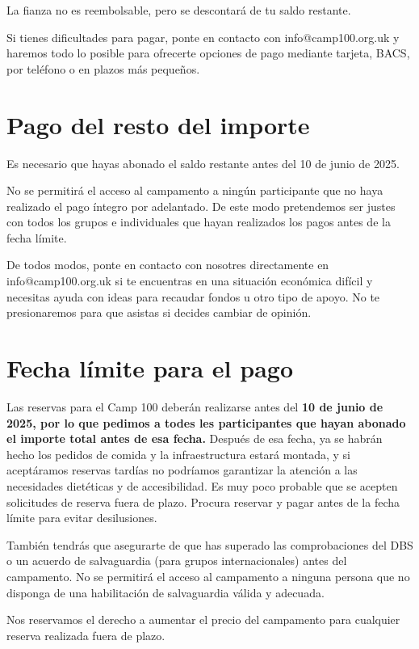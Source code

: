 \documentclass[a4paper, 11pt]{report}
\begin{document}
La fianza no es reembolsable, pero se descontar\'a de tu saldo restante.

Si tienes dificultades para pagar, ponte en contacto con info@camp100.org.uk y haremos todo lo posible para ofrecerte opciones de pago mediante tarjeta, BACS, por tel\'efono o en plazos m\'as peque\~nos. 


\section{Pago del resto del importe}
Es necesario que hayas abonado el saldo restante antes del 10 de junio de 2025.   

No se permitir\'a el acceso al campamento a ning\'un participante que no haya realizado el pago \'integro por adelantado. De este modo pretendemos ser justes con todos los grupos e individuales que hayan realizados los pagos antes de la fecha l\'imite. 

De todos modos, ponte en contacto con nosotres directamente en info@camp100.org.uk si te encuentras en una situaci\'on econ\'omica dif\'icil y necesitas ayuda con ideas para recaudar fondos u otro tipo de apoyo. No te presionaremos para que asistas si decides cambiar de opini\'on.

\section{Fecha l\'imite para el pago}
Las reservas para el Camp 100 deber\'an realizarse antes del \textbf{10 de junio de 2025, por lo que pedimos a todes les participantes que hayan abonado el importe total antes de esa fecha.} Despu\'es de esa fecha, ya se habr\'an hecho los pedidos de comida y la infraestructura estar\'a montada, y si acept\'aramos reservas tard\'ias no podr\'iamos garantizar la atenci\'on a las necesidades diet\'eticas y de accesibilidad. Es muy poco probable que se acepten solicitudes de reserva fuera de plazo. Procura reservar y pagar antes de la fecha l\'imite para evitar desilusiones. 

Tambi\'en tendr\'as que asegurarte de que has superado las comprobaciones del DBS o un acuerdo de salvaguardia (para grupos internacionales) antes del campamento. No se permitir\'a el acceso al campamento a ninguna persona que no disponga de una habilitaci\'on de salvaguardia v\'alida y adecuada. 

Nos reservamos el derecho a aumentar el precio del campamento para cualquier reserva realizada fuera de plazo.
\end{document}
